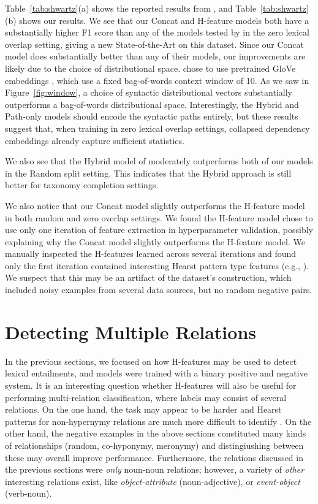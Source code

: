 Table~\ref{tab:shwartz}(a) shows the reported results from
, and Table~\ref{tab:shwartz}(b) shows our results.
We see that our Concat and H-feature models both have a substantially higher F1
score than any of the models tested by  in the zero
lexical overlap setting, giving a new State-of-the-Art on this dataset. Since
our Concat model does substantially better than any of their models, our
improvements are likely due to the choice of distributional space.
 chose to use pretrained GloVe embeddings
\cite{pennington:2014:emnlp}, which use a fixed bag-of-words context window of
10.  As we saw in Figure~\ref{fig:window}, a choice of syntactic distributional
vectors substantially outperforms a bag-of-words distributional space.
Interestingly, the Hybrid and Path-only models should encode the syntactic
paths entirely, but these results suggest that, when training in zero lexical
overlap settings, collapsed dependency embeddings already capture sufficient
statistics. 

We also see that the Hybrid model of  moderately
outperforms both of our models in the Random split setting. This indicates that
the Hybrid approach is still better for taxonomy completion settings.

We also notice that our Concat model slightly outperforms the H-feature model
in both random and zero overlap settings. We found the H-feature model chose to
use only one iteration of feature extraction in hyperparameter validation,
possibly explaining why the Concat model slightly outperforms the H-feature
model. We manually inspected the H-features learned across several iterations
and found only the first iteration contained interesting Hearst pattern type
features (e.g., ). We suspect that this may be an artifact of the
dataset's construction, which included noisy examples from several data
sources, but no random negative pairs.

\section{Detecting Multiple Relations}

In the previous sections, we focused on how H-features may be used to detect
lexical entailments, and models were trained with a binary positive and
negative system. It is an interesting question whether H-features will also be useful
for performing multi-relation classification, where labels may consist of
several relations. On the one hand, the task may appear to be harder and Hearst
patterns for non-hypernymy relations are much more difficult to identify \cite{girju:2006:cl}.
On the other hand, the negative examples in the above sections constituted
many kinds of relationships (random, co-hyponymy, meronymy) and distingiushing
between these may overall improve performance. Furthermore, the relations
discussed in the previous sections were {\em only} noun-noun relations; however,
a variety of {\em other} interesting relations exist, like
{\em object-attribute} (noun-adjective), or {\em event-object} (verb-noun).

